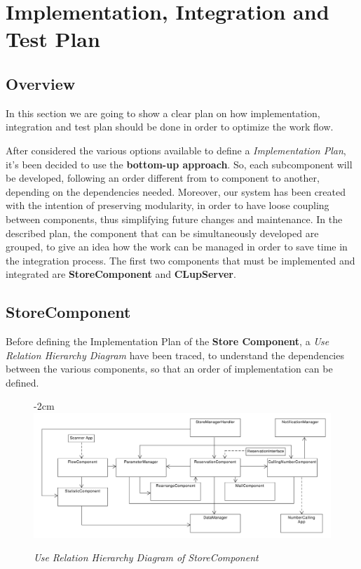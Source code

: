 \documentclass{article}
\begin{document}
\section{Implementation, Integration and Test Plan}
	\subsection{Overview}
	In this section we are going to show a clear plan on how implementation, integration and test plan should be done in order to optimize the work flow.
	
	After considered the various options available to define a \emph{Implementation Plan}, it's been decided to use the {\bfseries bottom-up approach}. So, each subcomponent will be developed, following an order different from to component to another, depending on the dependencies needed. Moreover, our system has been created with the intention of preserving modularity, in order to have loose coupling between components, thus simplifying future changes and maintenance. In the described plan, the component that can be simultaneously developed are grouped, to give an idea how the work can be managed in order to save time in the integration process.
	The first two components that must be implemented and integrated are {\bfseries StoreComponent} and {\bfseries CLupServer}.
	

		\subsection{StoreComponent}
		Before defining the Implementation Plan of the {\bfseries Store Component}, a \emph{Use Relation Hierarchy Diagram} have been traced, to understand the dependencies between the various components, so that an order of implementation can be defined.
		
		\begin{figure}[!h]
			\begin{adjustwidth} {-2cm}{}
				\centering
				\includegraphics[scale=0.4]{Hierchical Diagrams/StoreHierarchy.pdf}\\
			\end{adjustwidth}
			\caption{\emph{Use Relation Hierarchy Diagram of StoreComponent}}
		\end{figure}
				
\end{document}
